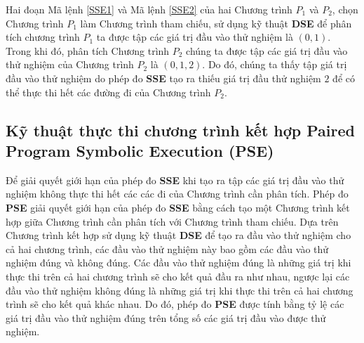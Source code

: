 Hai đoạn Mã lệnh \ref{SSE1} và Mã lệnh \ref{SSE2} của hai Chương trình $P_{1}$ và $P_{2}$, chọn Chương trình $P_{1}$ làm Chương trình tham chiếu, sử dụng kỹ thuật \textbf{DSE} để phân tích chương trình $P_{1}$ ta được tập các giá trị đầu vào thử nghiệm là ${(0, 1)}$. Trong khi đó, phân tích Chương trình $P_{2}$ chúng ta được tập các giá trị đầu vào thử nghiệm của Chương trình $P_{2}$  là ${(0, 1, 2)}$. Do đó, chúng ta thấy tập giá trị đầu vào thử nghiệm do phép đo \textbf{SSE} tạo ra thiếu giá trị đầu thử nghiệm $2$ để có thể thực thi hết các đường đi của Chương trình $P_{2}$.

\subsection{Kỹ thuật thực thi chương trình kết hợp Paired Program Symbolic Execution (PSE)}
Để giải quyết giới hạn của phép đo \textbf{SSE} khi tạo ra tập các giá trị đầu vào thử nghiệm không thực thi hết các các đi của Chương trình cần phân tích. Phép đo \textbf{PSE} giải quyết giới hạn của phép đo \textbf{SSE} bằng cách tạo một Chương trình kết hợp giữa Chương trình cần phân tích với Chương trình tham chiếu. Dựa trên Chương trình kết hợp sử dụng kỹ thuật \textbf{DSE} để tạo ra đầu vào thử nghiệm cho cả hai chương trình, các đầu vào thử nghiệm này bao gồm các đầu vào thử nghiệm đúng và không đúng. Các đầu vào thử nghiệm đúng là những giá trị khi thực thi trên cả hai chương trình sẽ cho kết quả đầu ra như nhau, ngược lại các đầu vào thử nghiệm không đúng là những giá trị khi thực thi trên cả hai chương trình sẽ cho kết quả khác nhau. Do đó, phép đo \textbf{PSE} được tính bằng tỷ lệ các giá trị đầu vào thử nghiệm đúng trên tổng số các giá trị đầu vào được thử nghiệm. 



